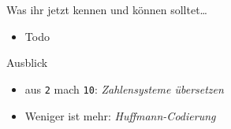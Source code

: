 
\section{}
	\begin{frame}{Was ihr jetzt kennen und können solltet\dots}
			\begin{itemize}
				\item Todo
			\end{itemize}
	
	\end{frame}
	\begin{frame}{Ausblick}
		\begin{itemize}
			\item aus \texttt{2} mach \texttt{10}: \emph{Zahlensysteme übersetzen} 
			\item Weniger ist mehr: \emph{Huffmann-Codierung}
		\end{itemize}
	\end{frame}
\section{}
\questionframe
\lastframe
